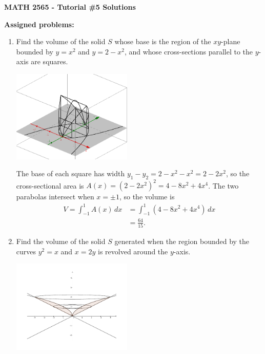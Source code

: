\documentclass[12pt]{article}
\begin{document}
\author{Instructor: Sean Fitzpatrick}
\thispagestyle{empty}
\begin{center}

{\bf MATH 2565 - Tutorial \#5 Solutions}
\end{center}

\textbf{Assigned problems:}


 \begin{enumerate}



 \item Find the volume of the solid $S$ whose base is the region of the $xy$-plane bounded by $y=x^2$ and $y=2-x^2$, and whose cross-sections parallel to the $y$-axis are squares.
 
\medskip

\begin{multicols}{2}
\begin{center}
 \includegraphics[width=0.45\textwidth]{WS4-2a.png}
\end{center}

The base of each square has width $y_1-y_2 = 2-x^2-x^2 = 2-2x^2$, so the cross-sectional area is $A(x) = (2-2x^2)^2 = 4-8x^2+4x^4$. The two parabolas intersect when $x=\pm 1$, so the volume is
\begin{align*}
 V=\int_{-1}^1A(x)\,dx &= \int_{-1}^1(4-8x^2+4x^4)\,dx \\&= \frac{64}{15}.
\end{align*}
 \end{multicols}
 
 \item Find the volume of the solid $S$ generated when the region bounded by the curves $y^2=x$ and $x=2y$ is revolved around the $y$-axis.
 
 \medskip
 
 \begin{multicols}{2}
  \includegraphics[width=0.45\textwidth]{WS4-2d}



\end{multicols}
\end{enumerate}
\end{document}
